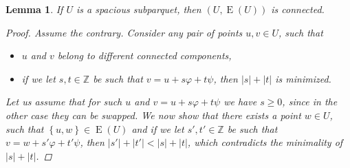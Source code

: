 \documentclass[11pt]{article}
\newcommand{\Z}{\mathbb{Z}}
\renewcommand{\phi}{\varphi}
\newcommand{\set}[1]{\left\lbrace #1 \right\rbrace}
\theoremstyle{plain}
\newtheorem{lemma}{Lemma}
\theoremstyle{definition}
\theoremstyle{remark}
\DeclareMathOperator*{\Edges}{E}
\begin{document}
\begin{lemma}\label{lattice_graph_connectivity}
	If $U$ is a spacious subparquet, then $(U, \Edges(U))$ is connected.
	\begin{proof}
		Assume the contrary.
		Consider any pair of points $u, v \in U$, such that
		\begin{itemize}
			\item $u$ and $v$ belong to different connected components,
			\item if we let $s, t \in \Z$ be such that $v = u + s \phi + t \psi$, then $|s| + |t|$ is minimized.
		\end{itemize}
		Let us assume that for such $u$ and $v = u + s \phi + t \psi$ we have $s \ge 0$, since in the other case they can be swapped.
		We now show that there exists a point $w \in U$, such that $\set{u, w} \in \Edges(U)$ and if we let $s', t' \in \Z$ be such that $v = w + s'\phi + t'\psi$, then $|s'| + |t'| < |s| + |t|$, which contradicts the minimality of $|s| + |t|$. 
	

\end{proof}
\end{lemma}
\end{document}
